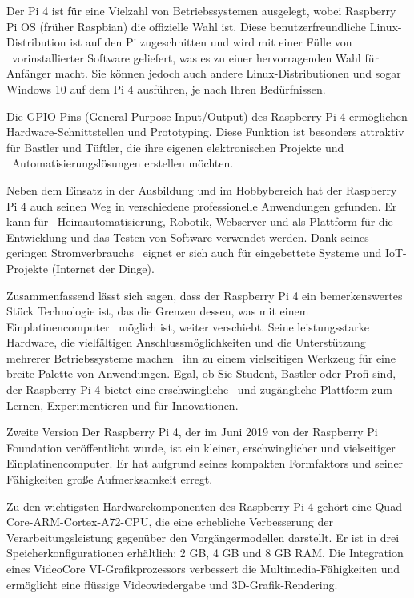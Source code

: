 Der Pi 4 ist für eine Vielzahl von Betriebssystemen ausgelegt, wobei Raspberry Pi OS (früher Raspbian) die offizielle Wahl ist. Diese benutzerfreundliche Linux-Distribution ist auf den Pi zugeschnitten und wird mit einer Fülle von \ 
vorinstallierter Software geliefert, was es zu einer hervorragenden Wahl für Anfänger macht. Sie können jedoch auch andere Linux-Distributionen und sogar Windows 10 auf dem Pi 4 ausführen, je nach Ihren Bedürfnissen.

Die GPIO-Pins (General Purpose Input/Output) des Raspberry Pi 4 ermöglichen Hardware-Schnittstellen und Prototyping. Diese Funktion ist besonders attraktiv für Bastler und Tüftler, die ihre eigenen elektronischen Projekte und \ 
Automatisierungslösungen erstellen möchten.

Neben dem Einsatz in der Ausbildung und im Hobbybereich hat der Raspberry Pi 4 auch seinen Weg in verschiedene professionelle Anwendungen gefunden. Er kann für \ 
Heimautomatisierung, Robotik, Webserver und als Plattform für die Entwicklung und das Testen von Software verwendet werden. Dank seines geringen Stromverbrauchs \ 
eignet er sich auch für eingebettete Systeme und IoT-Projekte (Internet der Dinge).

Zusammenfassend lässt sich sagen, dass der Raspberry Pi 4 ein bemerkenswertes Stück Technologie ist, das die Grenzen dessen, was mit einem Einplatinencomputer \ 
möglich ist, weiter verschiebt. Seine leistungsstarke Hardware, die vielfältigen Anschlussmöglichkeiten und die Unterstützung mehrerer Betriebssysteme machen \ 
ihn zu einem vielseitigen Werkzeug für eine breite Palette von Anwendungen. Egal, ob Sie Student, Bastler oder Profi sind, der Raspberry Pi 4 bietet eine erschwingliche \ 
und zugängliche Plattform zum Lernen, Experimentieren und für Innovationen.


Zweite Version \break
Der Raspberry Pi 4, der im Juni 2019 von der Raspberry Pi Foundation veröffentlicht wurde, ist ein kleiner, erschwinglicher und vielseitiger Einplatinencomputer. Er hat aufgrund seines kompakten Formfaktors und seiner Fähigkeiten große Aufmerksamkeit erregt.

Zu den wichtigsten Hardwarekomponenten des Raspberry Pi 4 gehört eine Quad-Core-ARM-Cortex-A72-CPU, die eine erhebliche Verbesserung der Verarbeitungsleistung gegenüber den Vorgängermodellen darstellt. Er ist in drei Speicherkonfigurationen erhältlich: 2 GB, 4 GB und 8 GB RAM. Die Integration eines VideoCore VI-Grafikprozessors verbessert die Multimedia-Fähigkeiten und ermöglicht eine flüssige Videowiedergabe und 3D-Grafik-Rendering.


